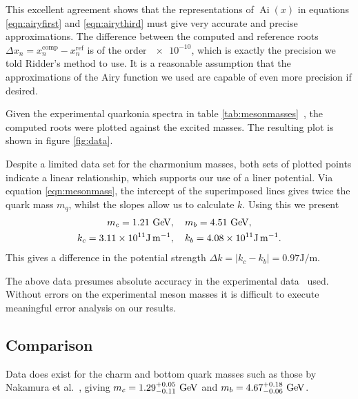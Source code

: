 \documentclass[]{article}
\renewcommand{\mod}[1]{\ensuremath{\lvert {#1} \rvert}}
\newcommand{\Ai}[1]{\ensuremath{\operatorname{Ai}({#1})}}
\begin{document}
This excellent agreement shows that the representations of \Ai{x} in equations \ref{eqn:airyfirst} and \ref{eqn:airythird} must give very accurate and precise approximations. The difference between the computed and reference roots $\Delta x_{n} = x_{n}^{\mathrm{comp}} - x_{n}^{\mathrm{ref}}$ is of the order $\num{e-10}$, which is exactly the precision we told Ridder's method to use. It is a reasonable assumption that the approximations of the Airy function we used are capable of even more precision if desired.\footnotemark


Given the experimental quarkonia spectra in table \ref{tab:mesonmasses}~\cite{ref:gdaniell}, the computed roots were plotted against the excited masses. The resulting plot is shown in figure \ref{fig:data}.

Despite a limited data set for the charmonium masses, both sets of plotted points indicate a linear relationship, which supports our use of a liner potential. Via equation \ref{eqn:mesonmass}, the intercept of the superimposed lines gives twice the quark mass $m_{q}$, whilst the slopes allow us to calculate $k$. Using this we present
\begin{align*}
m_{c} = 1.21\GeV&,\quad m_{b} = 4.51\GeV,\\
k_{c} = \num{3.11e11}\si{\joule\per\metre}&,\quad k_{b} = \num{4.08e11}\si{\joule\per\metre}.
\end{align*}
This gives a difference in the potential strength $\Delta k = \mod{k_{c} - k_{b}} = 0.97\si{\joule\per\metre}$.

The above data presumes absolute accuracy in the experimental data~\cite{ref:gdaniell} used. Without errors on the experimental meson masses it is difficult to execute meaningful error analysis on our results.

\subsection{Comparison}

Data does exist for the charm and bottom quark masses such as those by Nakamura et al.~\cite{ref:pdg}, giving $m_{c} = 1.29^{+0.05}_{-0.11}\GeV$ and $m_{b} = 4.67^{+0.18}_{-0.06}\GeV$.\footnotemark
\end{document}

